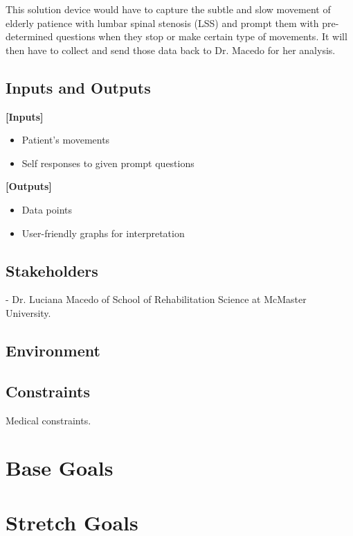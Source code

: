 \documentclass{article}
\begin{document}
This solution device would have to capture the subtle and slow movement of elderly patience with lumbar spinal stenosis (LSS) and prompt them with pre-determined questions when they stop or make certain type of  movements. It will then have to collect and send those data back to Dr. Macedo for her analysis.

\subsection{Inputs and Outputs}

\textbf{[Inputs]}
\begin{itemize}
\item Patient's movements
\item Self responses to given prompt questions
\end{itemize}

\textbf{[Outputs]}
\begin{itemize}
\item Data points
\item User-friendly graphs for interpretation
\end{itemize}

\subsection{Stakeholders}

- Dr. Luciana Macedo of School of Rehabilitation Science at McMaster University.

\subsection{Environment}

\subsection{Constraints}
Medical constraints.

\section{Base Goals}

\section{Stretch Goals}
\end{document}
